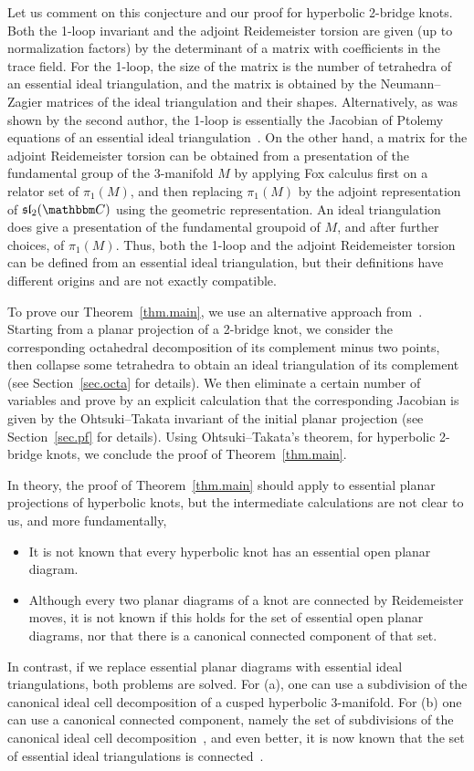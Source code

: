 \documentclass[12pt,reqno]{amsart}
\theoremstyle{definition}
\def\BC{\mathbbm C}
\begin{document}
Let us comment on this conjecture and our proof for hyperbolic 2-bridge knots.
Both the 1-loop invariant and the adjoint Reidemeister torsion are given (up to
normalization factors) by the determinant of a matrix with coefficients in the
trace field. For the 1-loop, the size of the matrix is the number of tetrahedra
of an essential ideal triangulation, and the matrix is obtained by the Neumann--Zagier
matrices of the ideal triangulation and their shapes. Alternatively, as was shown by
the second author, the 1-loop is essentially the Jacobian of Ptolemy
equations of an essential ideal triangulation~\cite{Yoon2024}. On the other hand, 
a matrix for the adjoint Reidemeister torsion can be obtained from a presentation of
the fundamental group of the 3-manifold $M$ by applying Fox calculus first on
a relator set of $\pi_1(M)$, and then replacing $\pi_1(M)$ by the adjoint
representation of $\mathfrak{sl}_2(\BC)$ using
the geometric representation. An ideal triangulation does give a presentation
of the fundamental groupoid of $M$, and after further choices, of $\pi_1(M)$.
Thus, both the 1-loop and the adjoint Reidemeister torsion can be defined from
an essential ideal triangulation, but their definitions have different origins and
are not exactly compatible. 

To prove our Theorem~\ref{thm.main}, we use an alternative approach
from~\cite{DGY2023}. Starting from a planar projection of a 2-bridge knot,
we consider the corresponding octahedral decomposition of its complement minus two
points, then collapse some tetrahedra to obtain an ideal triangulation of its
complement (see Section~\ref{sec.octa} for details).
We then eliminate a certain number of variables and prove by an explicit
calculation that the corresponding Jacobian is given by the Ohtsuki--Takata invariant
of the initial planar projection (see Section~\ref{sec.pf} for details).
Using Ohtsuki--Takata's theorem, \cite[Thm.1.1]{OT2015} for hyperbolic 2-bridge knots,
we conclude the proof of Theorem~\ref{thm.main}.

In theory, the proof of Theorem~\ref{thm.main} should apply to essential planar
projections of hyperbolic knots, but the intermediate calculations are not clear
to us, and more fundamentally, 

\begin{itemize}
\item[(a)]
  It is not known that every hyperbolic knot has an essential open planar diagram.
\item[(b)]
  Although every two planar diagrams of a knot are connected by Reidemeister moves,
  it is not known if this holds for the set of essential open planar diagrams, nor
  that there is a canonical connected component of that set. 
\end{itemize}
In contrast, if we replace essential planar diagrams with essential ideal
triangulations, both problems are solved. For (a), one can use a subdivision of
the canonical ideal cell decomposition of a cusped hyperbolic 3-manifold. For (b)
one can use a canonical connected component, namely the set of subdivisions of the
canonical ideal cell decomposition~\cite{DG1}, and even better, it is now known
that the set of essential ideal triangulations is connected~\cite{KSS24}.
\end{document}
